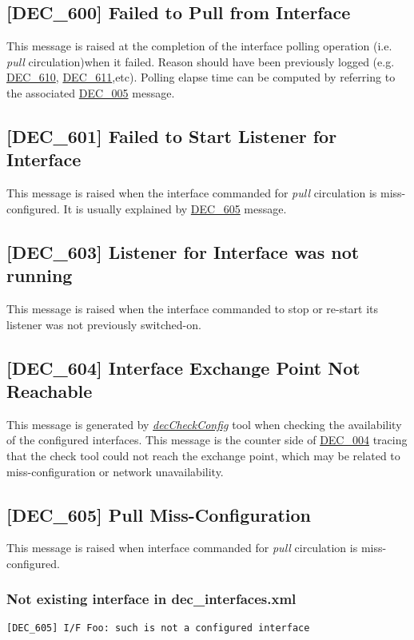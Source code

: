 \documentclass[dec_sum_main.tex]{subfiles}
\begin{document}
\label{DEC600}
\subsection{[DEC\_600] Failed to Pull from Interface}
This message is raised at the completion of the interface polling operation (i.e. \textit{pull} circulation)when it failed. Reason should have been previously logged (e.g. \hyperref[DEC610]{DEC\_610}, \hyperref[DEC611]{DEC\_611},etc). Polling elapse time can be computed by referring to the associated \hyperref[DEC005]{DEC\_005} message. 

\label{DEC601}
\subsection{[DEC\_601] Failed to Start Listener for Interface}
This message is raised when the interface commanded for \textit{pull} circulation is miss-configured. It is usually explained by \hyperref[DEC605]{DEC\_605} message. 

\label{DEC603}
\subsection{[DEC\_603] Listener for Interface was not running}
This message is raised when the interface commanded to stop or re-start its listener was not previously switched-on.

\label{DEC604}
\subsection{[DEC\_604] Interface Exchange Point Not Reachable}
This message is generated by \hyperref[decCheckConfig]{\textit{decCheckConfig}} tool when checking the availability of the configured interfaces. This message is the counter side of \hyperref[DEC004]{DEC\_004} tracing that the check tool could not reach the exchange point, which may be related to miss-configuration or network unavailability.

\label{DEC605}
\subsection{[DEC\_605] Pull Miss-Configuration}
This message is raised when interface commanded for \textit{pull} circulation is miss-configured.

\subsubsection{Not existing interface in dec\_interfaces.xml }
\begin{verbatim}
[DEC_605] I/F Foo: such is not a configured interface
\end{verbatim}
\end{document}
